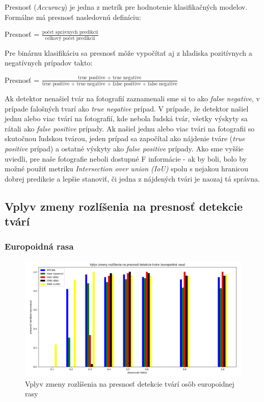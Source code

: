 \documentclass[]{article}
\newcommand*\textfrac[2]{
	\frac{\text{#1}}{\text{#2}}
}
\begin{document}
	Presnosť (\textit{Accuracy}) je jedna z metrík pre hodnotenie klasifikačných modelov. Formálne má presnosť nasledovnú definíciu:
	\begin{center}
		Presnosť = $\textfrac{počet správnych predikcií}{celkový počet predikcií}$
	\end{center}
	Pre binárnu klasifikáciu sa presnosť môže vypočítať aj z hľadiska pozitívnych a negatívnych prípadov takto:
	\begin{center}
		Presnosť = $\textfrac{true positive + true negative}{true positive + true negative + false positive + false negative}$
	\end{center}
	Ak detektor nenašiel tvár na fotografií zaznamenali sme si to ako \textit{false negative}, v prípade falošných tvarí ako \textit{true negative} prípad. V prípade, že detektor našiel jednu alebo viac tvárí na fotografií, kde nebola ľudská tvár, všetky výskyty sa rátali ako \textit{false positive} prípady. Ak našiel jednu alebo viac tvári na fotografii so skutočnou ľudskou tvárou, jeden prípad sa započítal ako nájdenie tváre (\textit{true positive} prípad) a ostatné výskyty ako \textit{false positive} prípady. Ako sme vyššie uviedli, pre naše fotografie neboli dostupné F informácie \-- ak by boli, bolo by možné použiť metriku \textit{Intersection over union (IoU)} spolu s nejakou hranicou dobrej predikcie a lepšie stanoviť, či jedna z nájdených tvári je naozaj tá správna.
	
	
	\subsection*{Vplyv zmeny rozlíšenia na presnosť detekcie tvárí}
	
	\subsubsection*{Europoidná rasa}
	
	\begin{figure}[h!]
		\includegraphics[width=\textwidth]{Vysledky_rozslisenie/europ/Figure_1.png}
		\caption{Vplyv zmeny rozlíšenia na presnosť detekcie tvárí osôb europoidnej rasy}
	\end{figure}
\end{document}
